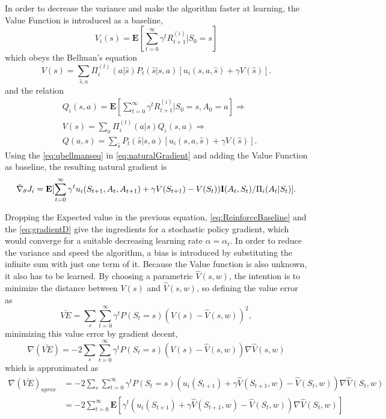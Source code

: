 \documentclass{article}
\begin{document}
In order to decrease the variance and make the algorithm faster at learning, the Value Function is introduced as a baseline, 
\begin{equation}
    V_i(s) = \mathbf{E}[\sum_{t=0}^{\infty} \gamma^t R_{t+1}^{(i)}|S_0 = s]
\end{equation}
which obeys the Bellman's equation
\begin{equation}
    V(s) = \sum_{\hat{s},a} \Pi^{(t)}_i(a|\hat{s})P_t(\hat{s}|s,a)[u_i(s,a,\hat{s}) + \gamma V(\hat{s})].
\end{equation}
and the relation
\begin{equation}\label{eq:qbellmanseq}\begin{aligned}
    &Q_i(s,a) = \mathbf{E}[\sum_{t=0}^{\infty} \gamma^t R_{t+1}^{(i)}|S_0 = s,A_0 = a] \Rightarrow\\&V(s)= \sum_a \Pi^{(t)}_i(a|s)Q_i(s,a) \Rightarrow \\& Q(a,s) = \sum_{\hat{s}} P_t(\hat{s}|s,a)[u_i(s,a,\hat{s}) + \gamma V(\hat{s})].
\end{aligned}
\end{equation}
Using the \cref{eq:qbellmanseq} in \cref{eq:naturalGradient} and adding the Value Function as baseline, the resulting natural gradient is
\begin{equation}
\label{eq:ReinforceBaseline}
    \Tilde{\nabla}_\theta J_i =\mathbf{E}[ \sum_{t=0}^\infty \gamma^tu_i(S_{t+1},A_t,A_{t+1}) + \gamma V(S_{t+1}) - V(S_t))\mathbf{I}(A_t,S_t)/\Pi_i(A_t|S_t)].
\end{equation}

Dropping the Expected value in the previous equation, \cref{eq:ReinforceBaseline} and the \cref{eq:gradientD} give the ingredients for a stochastic policy gradient, which would converge for a suitable decreasing learning rate $\alpha=\alpha_t$. In order to reduce the variance and speed the algorithm, a bias is introduced by substituting the infinite sum with just one term of it. Because the Value function is also unknown, it also has to be learned. By choosing a parametric $\hat{V}(s,w)$, the intention is to minimize the distance between $V(s)$ and $\hat{V}(s,w)$, so defining the value error as 
\begin{equation}
    \bar{VE} = \sum_{s} \sum_{t=0}^\infty \gamma^tP(S_t=s)(V(s) - \hat{V}(s,w))^2,
\end{equation}
minimizing this value error by gradient decent, 
\begin{equation}
    \nabla (\bar{VE}) = -2\sum_{s} \sum_{t=0}^\infty \gamma^tP(S_t=s)(V(s) - \hat{V}(s,w))\nabla \hat{V}(s,w)
\end{equation}
which is approximated as 
\begin{equation}
\begin{aligned}
    \nabla (\bar{VE})_{aprox} &=  -2\sum_{s} \sum_{t=0}^\infty \gamma^tP(S_t=s)(u_i(S_{t+1}) +\gamma \hat{V}(S_{t+1},w) - \hat{V}(S_t,w))\nabla \hat{V}(S_t,w)\\&=-2\sum_{t=0}^\infty \mathbf{E}[\gamma^t(u_i(S_{t+1}) +\gamma \hat{V}(S_{t+1},w) - \hat{V}(S_t,w))\nabla \hat{V}(S_t,w)]
\end{aligned}
\end{equation}
\end{document}
